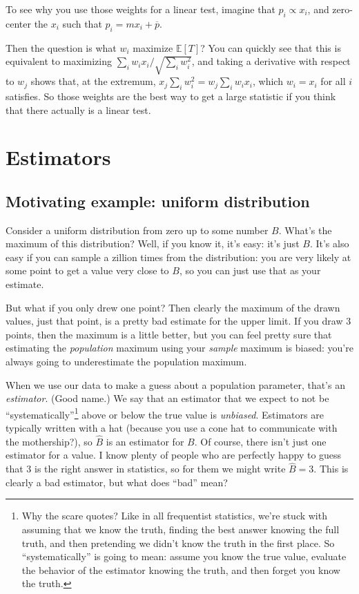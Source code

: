 \documentclass{book}
\begin{document}
To see why you use those weights for a linear test, imagine that
\(p_i \propto x_i\), and zero-center the \(x_i\) such that
\(p_i = m x_i + \overline{p}\).

Then the question is what \(w_i\) maximize \(\mathbb{E}[T]\)? You can
quickly see that this is equivalent to maximizing
\(\sum_i w_i x_i / \sqrt{\sum_i w_i^2}\), and taking a derivative with
respect to \(w_j\) shows that, at the extremum,
\(x_j \sum_i w_i^2 = w_j \sum_i w_i x_i\), which \(w_i = x_i\) for all
\(i\) satisfies. So those weights are the best way to get a large
statistic if you think that there actually is a linear test.

\section{Estimators}\label{estimators}

\subsection{Motivating example: uniform
distribution}\label{motivating-example-uniform-distribution}

Consider a uniform distribution from zero up to some number \(B\).
What's the maximum of this distribution? Well, if you know it, it's
easy: it's just \(B\). It's also easy if you can sample a zillion times
from the distribution: you are very likely at some point to get a value
very close to \(B\), so you can just use that as your estimate.

But what if you only drew one point? Then clearly the maximum of the
drawn values, just that point, is a pretty bad estimate for the upper
limit. If you draw 3 points, then the maximum is a little better, but
you can feel pretty sure that estimating the \emph{population} maximum
using your \emph{sample} maximum is biased: you're always going to
underestimate the population maximum.

When we use our data to make a guess about a population parameter,
that's an \emph{estimator}. (Good name.) We say that an estimator that
we expect to not be ``systematically''\footnote{Why the scare quotes?
  Like in all frequentist statistics, we're stuck with assuming that we
  know the truth, finding the best answer knowing the full truth, and
  then pretending we didn't know the truth in the first place. So
  ``systematically'' is going to mean: assume you know the true value,
  evaluate the behavior of the estimator knowing the truth, and then
  forget you know the truth.} above or below the true value is
\emph{unbiased}. Estimators are typically written with a hat (because
you use a cone hat to communicate with the mothership?), so \(\hat{B}\)
is an estimator for \(B\). Of course, there isn't just one estimator for
a value. I know plenty of people who are perfectly happy to guess that 3
is the right answer in statistics, so for them we might write
\(\hat{B} = 3\). This is clearly a bad estimator, but what does ``bad''
mean?
\end{document}
